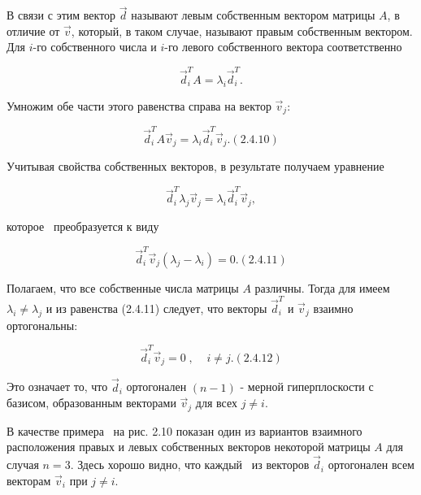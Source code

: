 		В связи с этим вектор  $\vec d$ называют левым собственным вектором матрицы  $A$, в отличие от  $\vec v$, который, в
		таком случае, называют правым собственным вектором. Для  $i$-го собственного числа и  $i$-го левого собственного
		вектора соответственно



		\begin{equation*}\label{key}
		\vec d_i^TA=\lambda _i\vec d_i^T.
		\end{equation*}



		Умножим обе части этого равенства справа на вектор  $\vec v_j$:



		\begin{equation}\label{key}
		\vec d_i^TA\vec v_j=\lambda _i\vec d_i^T\vec v_j.  (2.4.10)
		\end{equation}



		Учитывая свойства собственных векторов, в результате получаем уравнение



	\begin{equation*}\label{key}
	\vec d_i^T\lambda _j\vec v_j=\lambda _i\vec d_i^T\vec v_j,
	\end{equation*}



		которое \ преобразуется к виду



		\begin{equation}\label{key}
		  \vec d_i^T\vec v_j(\lambda _j-\lambda _i)=0.  (2.4.11)
		\end{equation}



		Полагаем, что все собственные числа матрицы  $A$ различны. Тогда для %
	имеем  $\lambda _i\neq \lambda _j$ и из равенства (2.4.11) следует, что
		векторы  $\vec d_i^T$ и  $\vec v_j$ взаимно ортогональны:


\begin{equation}\label{key}
		  \vec d_i^T\vec v_j=0\;,\;\;\;\;i\neq j.  (2.4.12)
\end{equation}



		Это означает то, что  $\vec d_i$ ортогонален  $(n-1)$\textit{ }- мерной гиперплоскости с базисом, образованным векторами
		$\vec v_j$ для всех  $j\neq i$.



		В качестве примера \ на рис. 2.10 показан один из вариантов взаимного расположения правых и левых собственных векторов
		некоторой матрицы  $A$ для случая  $n=3$. Здесь хорошо видно, что каждый \ из векторов  $\vec d_i$ ортогонален всем
		векторам  $\vec v_i$ при  $j\neq i$.


